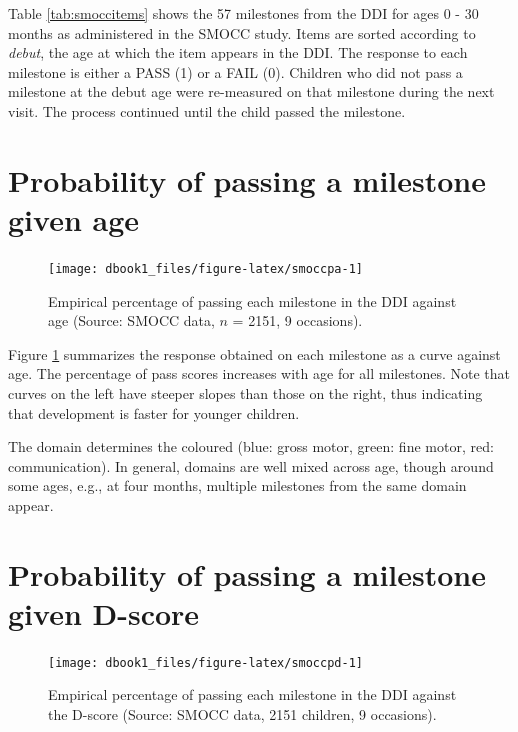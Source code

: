 \documentclass[
]{book}
\begin{document}
Table \ref{tab:smoccitems} shows the 57 milestones from the DDI for ages 0 - 30 months as administered in the SMOCC study. Items are sorted according to \emph{debut}, the age at which the item appears in the DDI. The response to each milestone is either a PASS (1) or a FAIL (0). Children who did not pass a milestone at the debut age were re-measured on that milestone during the next visit. The process continued until the child passed the milestone.

\hypertarget{sec:probage}{%
\section{Probability of passing a milestone given age}\label{sec:probage}}

\begin{figure}

{\centering \texttt{[image: dbook1\_files/figure-latex/smoccpa-1]} 

}

\caption{Empirical percentage of passing each milestone in the DDI against age (Source: SMOCC data, \(n\) = 2151, 9 occasions).}\label{fig:smoccpa}
\end{figure}



Figure \ref{fig:smoccpa} summarizes the response obtained on each milestone as a curve against age. The percentage of pass scores increases with age for all milestones. Note that curves on the left have steeper slopes than those on the right, thus indicating that development is faster for younger children.

The domain determines the coloured (blue: gross motor, green: fine motor, red: communication). In general, domains are well mixed across age, though around some ages, e.g., at four months, multiple milestones from the same domain appear.

\hypertarget{sec:probd}{%
\section{Probability of passing a milestone given D-score}\label{sec:probd}}

\begin{figure}

{\centering \texttt{[image: dbook1\_files/figure-latex/smoccpd-1]} 

}

\caption{Empirical percentage of passing each milestone in the DDI against the D-score (Source: SMOCC data, 2151 children, 9 occasions).}\label{fig:smoccpd}
\end{figure}
\end{document}
